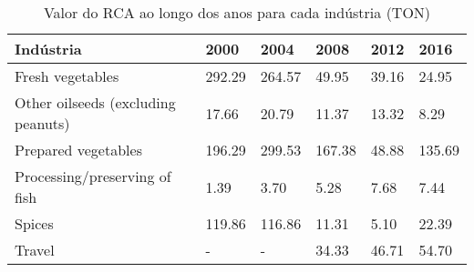 \begin{table}
\centering
\caption{Valor do RCA ao longo dos anos para cada indústria (TON)}
\begin{tabular}{p{6cm}p{1.5cm}p{1.5cm}p{1.5cm}p{1.5cm}p{1.5cm}}
\toprule
                         Indústria &   2000 &   2004 &   2008 &  2012 &   2016 \\
\midrule
                  Fresh vegetables & 292.29 & 264.57 &  49.95 & 39.16 &  24.95 \\
Other oilseeds (excluding peanuts) &  17.66 &  20.79 &  11.37 & 13.32 &   8.29 \\
               Prepared vegetables & 196.29 & 299.53 & 167.38 & 48.88 & 135.69 \\
     Processing/preserving of fish &   1.39 &   3.70 &   5.28 &  7.68 &   7.44 \\
                            Spices & 119.86 & 116.86 &  11.31 &  5.10 &  22.39 \\
                            Travel &      - &      - &  34.33 & 46.71 &  54.70 \\
\bottomrule
\end{tabular}
\end{table}
